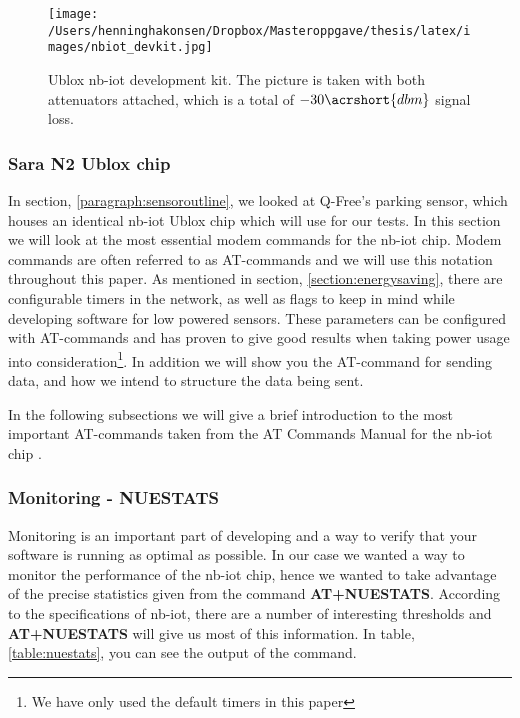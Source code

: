 \documentclass[USenglish]{ifimaster}  %
\begin{document}
\begin{figure}[ht]
  \centering\texttt{[image: /Users/henninghakonsen/Dropbox/Masteroppgave/thesis/latex/images/nbiot\_devkit.jpg]}
  \caption[Closeup of Ublox \acrshort{nb-iot} development kit]{Ublox \acrshort{nb-iot} development kit. The picture is taken with both attenuators attached, which is a total of ${-30\acrshort{dbm}}$ signal loss.}
  \label{pic:nbiotdevkit}
\end{figure}

\subsubsection{Sara N2 Ublox chip} \label{section:thechip}
In section, \vref{paragraph:sensoroutline}, we looked at Q-Free's parking sensor, which houses an identical \acrshort{nb-iot} Ublox chip which will use for our tests. In this section we will look at the most essential modem commands for the \acrshort{nb-iot} chip. Modem commands are often referred to as AT-commands and we will use this notation throughout this paper. As mentioned in section, \vref{section:energysaving}, there are configurable timers in the network, as well as flags to keep in mind while developing software for low powered sensors. These parameters can be configured with AT-commands and has proven to give good results when taking power usage into consideration\footnote{We have only used the default timers in this paper}. In addition we will show you the AT-command for sending data, and how we intend to structure the data being sent.

In the following subsections we will give a brief introduction to the most important AT-commands taken from the AT Commands Manual for the \acrshort{nb-iot} chip \cite{atcommand:ubloxchip}.

\subsubsection{Monitoring - NUESTATS}
Monitoring is an important part of developing and a way to verify that your software is running as optimal as possible. In our case we wanted a way to monitor the performance of the \acrshort{nb-iot} chip, hence we wanted to take advantage of the precise statistics given from the command \textbf{AT+NUESTATS}. According to the specifications of \acrshort{nb-iot}, there are a number of interesting thresholds and \textbf{AT+NUESTATS} will give us most of this information. In table, \vref{table:nuestats}, you can see the output of the command.
\end{document}
